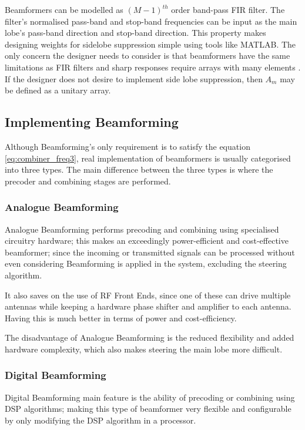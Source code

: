 \documentclass[12pt,a4paper]{report}
\begin{document}
Beamformers can be modelled as $(M-1)^{th}$ order band-pass FIR filter. The filter's normalised pass-band and stop-band frequencies can be input as the main lobe's pass-band direction and stop-band direction. This property makes designing weights for sidelobe suppression simple using tools like MATLAB. The only concern the designer needs to consider is that beamformers have the same limitations as FIR filters and sharp responses require arrays with many elements \cite{Liu2010}. If the designer does not desire to implement side lobe suppression, then $A_m$ may be defined as a unitary array.

\subsection{Implementing Beamforming} \label{back:bf:impl}
Although Beamforming's only requirement is to satisfy the equation \ref{eq:combiner_freq3}, real implementation of beamformers is usually categorised into three types. The main difference between the three types is where the precoder and combining stages are performed.

\subsubsection{Analogue Beamforming} \label{back:bf:impl:abf}
Analogue Beamforming performs precoding and combining using specialised circuitry hardware; this makes an exceedingly power-efficient and cost-effective beamformer; since the incoming or transmitted signals can be processed without even considering Beamforming is applied in the system, excluding the steering algorithm.

It also saves on the use of RF Front Ends, since one of these can drive multiple antennas while keeping a hardware phase shifter and amplifier to each antenna. Having this is much better in terms of power and cost-efficiency.

The disadvantage of Analogue Beamforming is the reduced flexibility and added hardware complexity, which also makes steering the main lobe more difficult.

\subsubsection{Digital Beamforming} \label{back:bd:impl:dbf}
Digital Beamforming main feature is the ability of precoding or combining using DSP algorithms; making this type of beamformer very flexible and configurable by only modifying the DSP algorithm in a processor.
\end{document}
